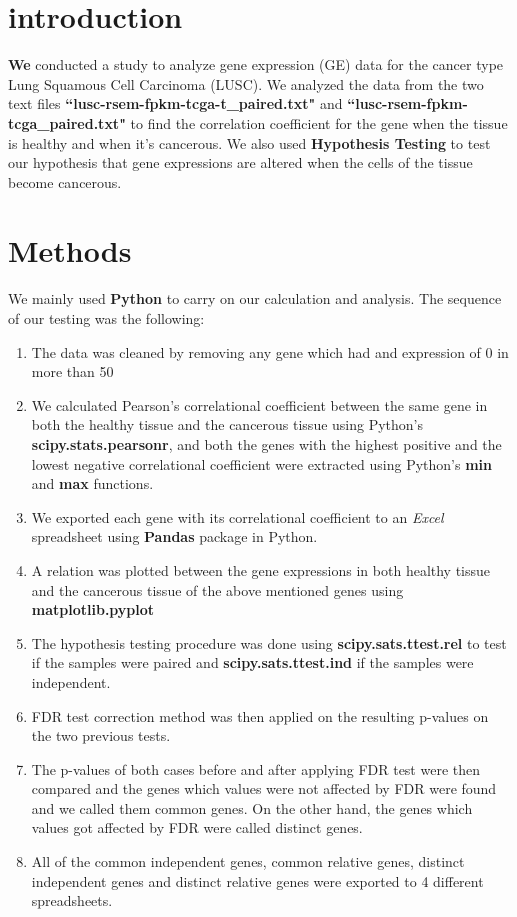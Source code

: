 \documentclass[conference,twocolumn]{IEEEtran}
\begin{document}
\pagestyle{plain}

\section{\textbf{introduction}}
\textbf{We} conducted a study to analyze gene expression (GE) data for the cancer type Lung
Squamous Cell Carcinoma (LUSC). We analyzed the data from the two text files \textbf{“lusc-rsem-fpkm-tcga-t\_paired.txt"} and \textbf{“lusc-rsem-fpkm-tcga\_paired.txt"} to find the correlation coefficient for the gene when the tissue is healthy and when it's cancerous. We also used \textbf{Hypothesis Testing} to test our hypothesis that gene expressions are altered when the cells of the tissue become cancerous.
\section{\textbf{Methods}}
We mainly used \textbf{Python} to carry on our calculation and analysis.
The sequence of our testing was the following:
\begin{enumerate}
    \item The data was cleaned by removing any gene which had and expression of 0 in more than 50%
    \item We calculated Pearson's correlational coefficient between the same gene in both the healthy tissue and the cancerous tissue using Python's \textbf{scipy.stats.pearsonr}, and both the genes with the highest positive and the lowest negative correlational coefficient were extracted using Python's \textbf{min} and \textbf{max} functions.
    \item We exported each gene with its correlational coefficient to an \textit{Excel} spreadsheet using \textbf{Pandas} package in Python.
    \item A relation was plotted between the gene expressions in both healthy tissue and the cancerous tissue of the above mentioned genes using \textbf{matplotlib.pyplot}
    \item The hypothesis testing procedure was done using \textbf{scipy.sats.ttest.rel} to test if the samples were paired and \textbf{scipy.sats.ttest.ind} if the samples were independent.
    \item FDR test correction method was then applied on the resulting p-values on the two previous tests.
    \item The p-values of both cases before and after applying FDR test were then compared and the genes which values were not affected by FDR were found and we called them common genes. On the other hand, the genes which values got affected by FDR were called distinct genes.
    \item All of the common independent genes, common relative genes, distinct independent genes and distinct relative genes were exported to 4 different spreadsheets.
\end{enumerate}
\end{document}
